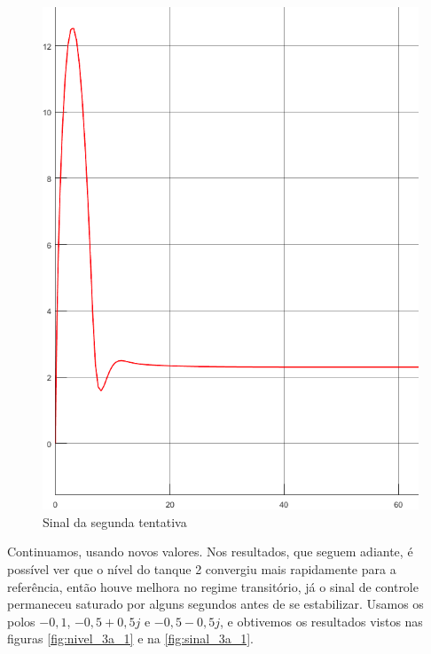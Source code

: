 \documentclass[
	12pt,				%
	openany,			%
	oneside,			%
	a4paper,			%
	english,			%
	french,				%
	spanish,			%
	brazil,				%
	]{abntex2}
\begin{document}
{\begin{figure}[h]
	\centering
	\includegraphics[scale=0.30]{imagens/sinal_3a_2.png}
	\caption{Sinal da segunda tentativa}
	\label{fig:sinal_3a_2}
\end{figure}

Continuamos, usando novos valores. Nos resultados, que seguem adiante, é possível ver que o nível do tanque 2 convergiu mais rapidamente para a referência, então houve melhora no regime transitório, já o sinal de controle permaneceu saturado por alguns segundos antes de se estabilizar. Usamos os polos $-0,1$, $-0,5 + 0,5j$ e $-0,5 - 0,5j$, e obtivemos os resultados vistos nas figuras \ref{fig:nivel_3a_1} e na \ref{fig:sinal_3a_1}.

}
\end{document}
